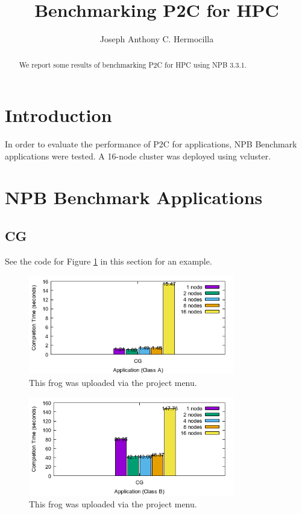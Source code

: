 \documentclass[a4paper]{article}
\title{Benchmarking P2C for HPC}
\author{Joseph Anthony C. Hermocilla}
\begin{document}
\maketitle

\begin{abstract}
We report some results of benchmarking P2C for HPC using NPB 3.3.1.
\end{abstract}

\section{Introduction}
In order to evaluate the performance of P2C for applications, NPB Benchmark applications were tested. A 16-node cluster was deployed using vcluster.

\section{NPB Benchmark Applications}

\subsection{CG}

See the code for Figure \ref{fig:CG_A} in this section for an example.


\begin{figure}
\centering
\includegraphics[width=0.8\textwidth]{figures/CG.A.png}
\caption{\label{fig:CG_A}This frog was uploaded via the project menu.}
\end{figure}

\begin{figure}
\centering
\includegraphics[width=0.8\textwidth]{figures/CG.B.png}
\caption{\label{fig:CG_B}This frog was uploaded via the project menu.}
\end{figure}





\end{document}
